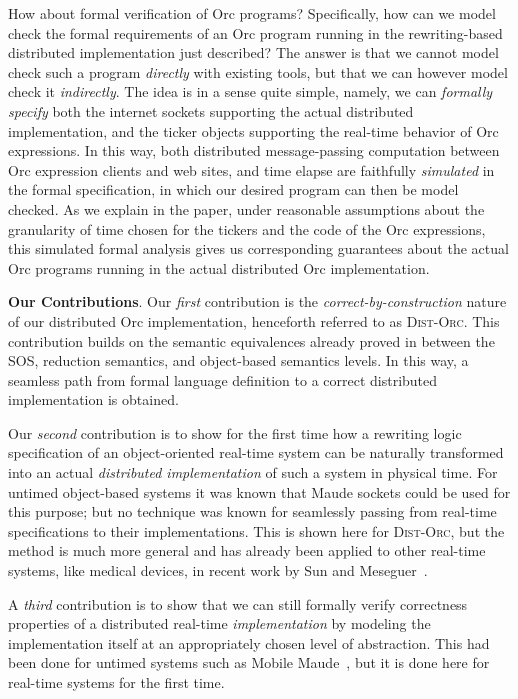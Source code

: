 \documentclass{eptcs}
\begin{document}
How about formal verification of Orc programs?  Specifically, how can
we model check the formal requirements of an Orc program running in
the rewriting-based distributed implementation just described?  The
answer is that we cannot model check such a program \emph{directly}
with existing tools, but that we can however model check it
\emph{indirectly}.  The idea is in a sense quite simple, namely, we
can \emph{formally specify} both the internet sockets supporting the
actual distributed implementation, and the ticker objects supporting
the real-time behavior of Orc expressions.  In this way, both
distributed message-passing computation between Orc expression clients
and web sites, and time elapse are faithfully \emph{simulated} in the
formal specification, in which our desired program can then be model
checked.  As we explain in the paper, under reasonable assumptions
about the granularity of time chosen for the tickers and the code of
the Orc expressions, this simulated formal analysis gives us
corresponding guarantees about the actual Orc programs running in the
actual distributed Orc implementation.

{\bf Our Contributions}.  Our \emph{first} contribution is the \emph{correct-by-construction} nature of our distributed Orc implementation, henceforth referred to as \textsc{Dist-Orc}.  This contribution builds on the semantic equivalences already proved in \cite{AlTurkiM07WWV} between the SOS, reduction semantics, and object-based semantics levels.  In this way, a seamless path from formal language definition to a correct distributed implementation is obtained.

Our \emph{second}  contribution is to show for the first
time how a rewriting logic specification of an object-oriented real-time system can be
naturally transformed into an actual \emph{distributed implementation} of such
a system in physical time.  For untimed object-based systems it was
known that Maude sockets could be used for this purpose; but no technique was known
for seamlessly passing from real-time specifications to their implementations.  This is
shown here for \textsc{Dist-Orc}, but the method is much more general and has already been
applied to other real-time systems, like medical devices, in recent work
by Sun and Meseguer~\cite{SunM10}.  

A \emph{third}  contribution is to show that we can still formally
verify correctness properties of a distributed real-time
\emph{implementation}  by modeling the implementation
itself at an appropriately chosen level of abstraction.  This had been done for
untimed systems such as Mobile Maude~\cite{maude-book}, but it is done here for real-time systems for the first time.
\end{document}
